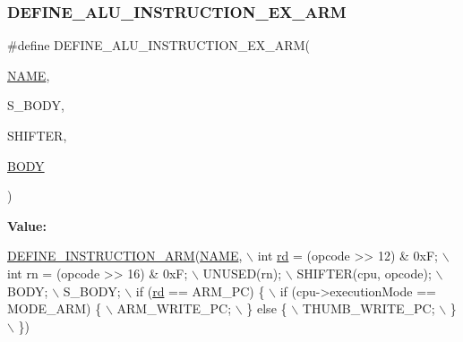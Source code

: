 \mbox{\label{isa-arm_8c_af5a7c9d844c906c7f00a6aa651397587}} 
\subsubsection{\texorpdfstring{D\+E\+F\+I\+N\+E\+\_\+\+A\+L\+U\+\_\+\+I\+N\+S\+T\+R\+U\+C\+T\+I\+O\+N\+\_\+\+E\+X\+\_\+\+A\+RM}{DEFINE\_ALU\_INSTRUCTION\_EX\_ARM}}
{\footnotesize\ttfamily \#define D\+E\+F\+I\+N\+E\+\_\+\+A\+L\+U\+\_\+\+I\+N\+S\+T\+R\+U\+C\+T\+I\+O\+N\+\_\+\+E\+X\+\_\+\+A\+RM(\begin{DoxyParamCaption}\item[{}]{\mbox{\hyperlink{inflate_8h_a164ea0159d5f0b5f12a646f25f99eceaa67bc2ced260a8e43805d2480a785d312}{N\+A\+ME}},  }\item[{}]{S\+\_\+\+B\+O\+DY,  }\item[{}]{S\+H\+I\+F\+T\+ER,  }\item[{}]{\mbox{\hyperlink{gzlog_8c_aa6bdf6a6d9916c343e1e17774d84a156}{B\+O\+DY}} }\end{DoxyParamCaption})}

{\bfseries Value\+:}
\begin{DoxyCode}
\mbox{\hyperlink{isa-arm_8c_a56ae89d1d9edfe3d78f30c0a60273883}{DEFINE\_INSTRUCTION\_ARM}}(\mbox{\hyperlink{inflate_8h_a164ea0159d5f0b5f12a646f25f99eceaa67bc2ced260a8e43805d2480a785d312}{NAME}}, \(\backslash\)
        \textcolor{keywordtype}{int} \mbox{\hyperlink{isa-arm_8c_a555541ce18ed9b5fad657a06b22cb465}{rd}} = (opcode >> 12) & 0xF; \(\backslash\)
        int rn = (opcode >> 16) & 0xF; \(\backslash\)
        UNUSED(rn); \(\backslash\)
        SHIFTER(cpu, opcode); \(\backslash\)
        BODY; \(\backslash\)
        S\_BODY; \(\backslash\)
        if (\mbox{\hyperlink{isa-arm_8c_a555541ce18ed9b5fad657a06b22cb465}{rd}} == ARM\_PC) \{ \(\backslash\)
            if (cpu->executionMode == MODE\_ARM) \{ \(\backslash\)
                ARM\_WRITE\_PC; \(\backslash\)
            \} \textcolor{keywordflow}{else} \{ \(\backslash\)
                THUMB\_WRITE\_PC; \(\backslash\)
            \} \(\backslash\)
        \})
\end{DoxyCode}
\mbox{\label{isa-arm_8c_ab758709bf7316fb44770422bb4da8956}} 
